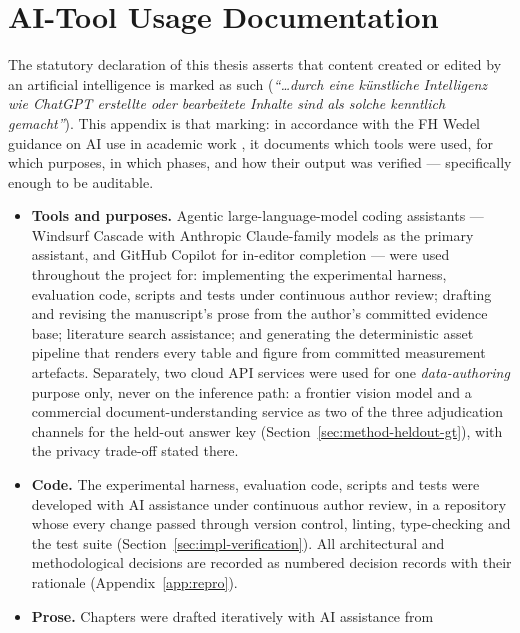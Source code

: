 \chapter{AI-Tool Usage Documentation}
\label{app:ai-usage}

The statutory declaration of this thesis asserts that content created or edited by an
artificial intelligence is marked as such (\emph{``\dots{}durch eine k\"unstliche
Intelligenz wie ChatGPT erstellte oder bearbeitete Inhalte sind als solche kenntlich
gemacht''}). This appendix is that marking: in accordance with the FH Wedel guidance on
AI use in academic work \parencite{fhwedelrichtlinie}, it documents which tools were used,
for which purposes, in which phases, and how their output was verified --- specifically
enough to be auditable.

\begin{itemize}
  \item \textbf{Tools and purposes.} Agentic large-language-model coding assistants ---
        Windsurf Cascade with Anthropic Claude-family models as the primary assistant,
        and GitHub Copilot for in-editor completion --- were used throughout the project
        for: implementing the experimental harness, evaluation code, scripts and tests
        under continuous author review; drafting and revising the manuscript's prose
        from the author's committed evidence base; literature search assistance; and
        generating the deterministic asset pipeline that renders every table and figure
        from committed measurement artefacts. Separately, two cloud \ac{API} services
        were used for one \emph{data-authoring} purpose only, never on the inference
        path: a frontier vision model and a commercial document-understanding service
        as two of the three adjudication channels for the held-out answer key
        (Section~\ref{sec:method-heldout-gt}), with the privacy trade-off stated there.
  \item \textbf{Code.} The experimental harness, evaluation code, scripts and tests
        were developed with AI assistance under continuous author review, in a
        repository whose every change passed through version control, linting,
        type-checking and the test suite (Section~\ref{sec:impl-verification}). All
        architectural and methodological decisions are recorded as numbered decision
        records with their rationale (Appendix~\ref{app:repro}).
  \item \textbf{Prose.} Chapters were drafted iteratively with AI assistance from

\end{itemize}
